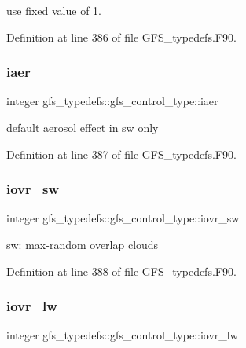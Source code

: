 use fixed value of 1. 



Definition at line 386 of file G\+F\+S\+\_\+typedefs.\+F90.

\mbox{\label{structgfs__typedefs_1_1gfs__control__type_af6dd7b7b99c1f5d5e09b39d6b8476f47}} 
\subsubsection{iaer}
{\footnotesize\ttfamily integer gfs\+\_\+typedefs\+::gfs\+\_\+control\+\_\+type\+::iaer}



default aerosol effect in sw only 



Definition at line 387 of file G\+F\+S\+\_\+typedefs.\+F90.

\mbox{\label{structgfs__typedefs_1_1gfs__control__type_a7590d13997f91bb6c84c930a00d0e790}} 
\subsubsection{iovr\+\_\+sw}
{\footnotesize\ttfamily integer gfs\+\_\+typedefs\+::gfs\+\_\+control\+\_\+type\+::iovr\+\_\+sw}



sw\+: max-\/random overlap clouds 



Definition at line 388 of file G\+F\+S\+\_\+typedefs.\+F90.

\mbox{\label{structgfs__typedefs_1_1gfs__control__type_a4c472fb025829317fdac304b48f67265}} 
\subsubsection{iovr\+\_\+lw}
{\footnotesize\ttfamily integer gfs\+\_\+typedefs\+::gfs\+\_\+control\+\_\+type\+::iovr\+\_\+lw}



